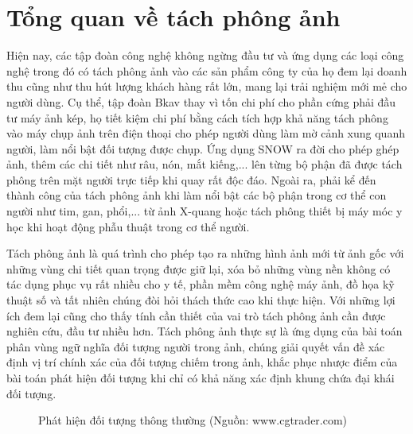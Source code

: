 \documentclass[../the.tex]{subfiles}
\begin{document}
\section{Tổng quan về tách phông ảnh}
\label{tong_quan}
{\fontsize{13}{12} \selectfont
Hiện nay, các tập đoàn công nghệ không ngừng đầu tư và ứng dụng các loại công nghệ trong đó có tách phông ảnh vào các sản phẩm công ty của họ đem lại doanh thu cũng như thu hút lượng khách hàng rất lớn, mang lại trải nghiệm mới mẻ cho người dùng. Cụ thể, tập đoàn Bkav thay vì tốn chi phí cho phần cứng phải đầu tư máy ảnh kép, họ tiết kiệm chi phí bằng cách tích hợp khả năng tách phông vào máy chụp ảnh trên điện thoại cho phép người dùng làm mờ cảnh xung quanh người, làm nổi bật đối tượng được chụp. Ứng dụng SNOW \cite{snow} ra đời cho phép ghép ảnh, thêm các chi tiết như râu, nón, mắt kiếng,... lên từng bộ phận đã được tách phông trên mặt người trực tiếp khi quay rất độc đáo. Ngoài ra, phải kể đến thành công của tách phông ảnh khi làm nổi bật các bộ phận trong cơ thể con người như tim, gan, phổi,... từ ảnh X-quang hoặc tách phông thiết bị máy móc y học khi hoạt động phẫu thuật trong cơ thể người.}
\bigskip

{\fontsize{13}{12} \selectfont
Tách phông ảnh là quá trình cho phép tạo ra những hình ảnh mới từ ảnh gốc với những vùng chi tiết quan trọng được giữ lại, xóa bỏ những vùng nền không có tác dụng phục vụ rất nhiều cho y tế, phần mềm công nghệ máy ảnh, đồ họa kỹ thuật số và tất nhiên chúng đòi hỏi thách thức cao khi thực hiện. Với những lợi ích đem lại cũng cho thấy tính cần thiết của vai trò tách phông ảnh cần được nghiên cứu, đầu tư nhiều hơn. Tách phông ảnh thực sự là ứng dụng của bài toán phân vùng ngữ nghĩa đối tượng người trong ảnh, chúng giải quyết vấn đề xác định vị trí chính xác của đối tượng chiếm trong ảnh, khắc phục nhược điểm của bài toán phát hiện đối tượng khi chỉ có khả năng xác định khung chứa đại khái đối tượng.}  
\bigskip
 

{\fontsize{13}{12} \selectfont
\begin{figure}[H]
\centering
{} %

	\caption{Phát hiện đối tượng thông thường (Nguồn: www.cgtrader.com)}
	\label{fig:detect}
\end{figure}}

\bigskip
\end{document}
